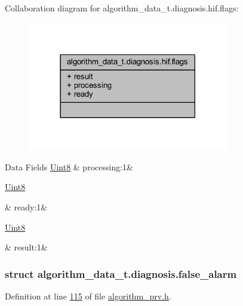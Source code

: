 Collaboration diagram for algorithm\+\_\+data\+\_\+t.\+diagnosis.\+hif.\+flags\+:\nopagebreak
\begin{figure}[H]
\begin{center}
\leavevmode
\includegraphics[width=249pt]{de/d01/a00897}
\end{center}
\end{figure}
\begin{DoxyFields}{Data Fields}
\hypertarget{a00016_a4374990dedc873c6a9417a355a2ac4cf}{\hyperlink{a00072_af84840501dec18061d18a68c162a8fa2}{Uint8}}\label{a00016_a4374990dedc873c6a9417a355a2ac4cf}
&
processing\+:1&
\\
\hline

\hypertarget{a00016_ab2fdab230a2c39f3595a947861863cb7}{\hyperlink{a00072_af84840501dec18061d18a68c162a8fa2}{Uint8}}\label{a00016_ab2fdab230a2c39f3595a947861863cb7}
&
ready\+:1&
\\
\hline

\hypertarget{a00016_ab4a88417b3d0170d754c647c30b7216a}{\hyperlink{a00072_af84840501dec18061d18a68c162a8fa2}{Uint8}}\label{a00016_ab4a88417b3d0170d754c647c30b7216a}
&
result\+:1&
\\
\hline

\end{DoxyFields}
\label{da/d74/a00099}
\hypertarget{a00016_da/d74/a00099}{}
\subsubsection{struct algorithm\+\_\+data\+\_\+t.\+diagnosis.\+false\+\_\+alarm}


Definition at line \hyperlink{a00016_source_l00115}{115} of file \hyperlink{a00016_source}{algorithm\+\_\+prv.\+h}.




